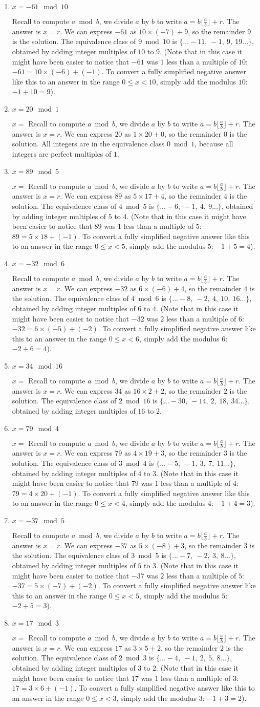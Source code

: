\documentclass[11pt, preview]{standalone} %
\newcommand{\modcomphint}{Recall to compute $a \bmod b$, we divide $a$ by $b$ to write $a = b\lfloor \frac{a}{b} \rfloor + r$. The answer is $x = r$.}
\newcommand{\modsol}[4]{We can express $#1$ as $#2 \times #4 + #3$, so the remainder $#3$ is the solution.}
\newcommand{\equivclass}[3]{The equivalence class of $#1 \bmod #2$ is $\{...#3...\}$, obtained by adding integer multiples of $#2$ to $#1$.}
\newcommand{\negans}[5]{(Note that in this case it might have been easier to notice that $#1$ was $#4$ less than a multiple of $#2$: $#1 = #2 \times #3 + (-#4)$. To convert a fully simplified negative answer like this to an answer in the range $0 \leq x < #2$, simply add the modulus $#2$: $-#4 + #2 = #5$).}
\begin{document}
\begin{enumerate}
\begin{enumerate}
\item $x = -61 \mod 10$
\begin{Freeform}{9}
\Hint \modcomphint
\Solution \modsol{-61}{10}{9}{(-7)} \equivclass{9}{10}{-11,\ -1,\ 9,\ 19} \negans{-61}{10}{(-6)}{1}{9}
\end{Freeform}

\item $x = 20 \mod 1$
\begin{Freeform}{0}
$x =$ 
\modcomphint
\Solution \modsol{20}{1}{0}{20} All integers are in the equivalence class $0 \bmod 1$, because all integers are perfect multiples of $1$.
\end{Freeform}

\item $x = 89 \mod 5$
\begin{Freeform}{4}
$x =$ 
\Hint \modcomphint
\Solution \modsol{89}{5}{4}{17} \equivclass{4}{5}{-6,\ -1,\ 4,\ 9} \negans{89}{5}{18}{1}{4}
\end{Freeform}

\item $x = -32 \mod 6$
\begin{Freeform}{4}
\Hint \modcomphint
\Solution \modsol{-32}{6}{4}{(-6)} \equivclass{4}{6}{-8,\ -2,\ 4,\ 10,\ 16} \negans{-32}{6}{(-5)}{2}{4}
\end{Freeform}

\item $x = 34 \mod 16$ 
\begin{Freeform}{2}
$x =$ 
\Hint \modcomphint
\Solution \modsol{34}{16}{2}{2} \equivclass{2}{16}{-30,\ -14,\ 2,\ 18,\ 34}
\end{Freeform}

\item $x = 79 \mod 4$
\begin{Freeform}{3}
$x =$ 
\Hint \modcomphint
\Solution \modsol{79}{4}{3}{19} \equivclass{3}{4}{-5,\ -1,\ 3,\ 7,\ 11} \negans{79}{4}{20}{1}{3}
\end{Freeform}

\item $x = -37 \mod 5$
\begin{Freeform}{3}
\Hint \modcomphint
\Solution \modsol{-37}{5}{3}{(-8)} \equivclass{3}{5}{-7,\ -2,\ 3,\ 8} \negans{-37}{5}{(-7)}{2}{3}
\end{Freeform}

\item $x = 17 \mod 3$ 
\begin{Freeform}{2}
$x =$ 
\Hint \modcomphint 
\Solution \modsol{17}{3}{2}{5} \equivclass{2}{3}{-4,\ -1,\ 2,\ 5,\ 8} \negans{17}{3}{6}{1}{2}
\end{Freeform}


\end{enumerate}
\end{enumerate}
\end{document}
